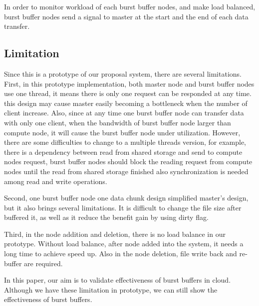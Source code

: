 In order to monitor workload of each burst buffer nodes, and make load balanced, burst buffer nodes send a signal to
master at the start and the end of each data transfer.

\subsection{Limitation}

Since this is a prototype of our proposal system, there are several limitations.
First, in this prototype implementation, both master node and burst buffer nodes use one thread, it means
there is only one request can be responded at any time.
this design may cause master easily becoming a bottleneck when the number of client increase.
Also, since at any time one burst buffer node can transfer data with only one client, when the bandwidth of
burst buffer node larger than compute node, it will cause the burst buffer node under utilization.
However, there are some difficulties to change to a multiple threads version, for example, there
is a dependency between read from shared storage and send to compute nodes request, burst buffer nodes should
block the reading request from compute nodes until the read from shared storage finished also
synchronization is needed among read and write operations.

Second, one burst buffer node one data chunk design simplified master's design, but it also brings several
limitations. It is difficult to change the file size after buffered it, as well as it reduce the
benefit gain by using dirty flag.

Third, in the node addition and deletion, there is no load balance in our prototype.
Without load balance, after node added into the system, it needs a long time to achieve speed up.
Also in the node deletion, file write back and re-buffer are required.

In this paper, our aim is to validate effectiveness of burst buffers in
cloud.
Although we have these limitation in prototype, we can still show the effectiveness of burst
buffers.